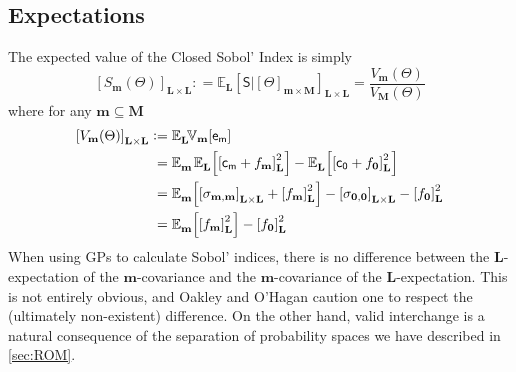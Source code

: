 \documentclass[preprint,12pt]{elsarticle}
\newcommand*{\M}[1]{\ensuremath{#1}\xspace}
\newcommand*{\x}{\times}
\newcommand*{\mi}[1]{\mathbf{#1}}
\newcommand*{\rv}[1]{\mathsf{#1}}
\newcommand*{\te}[2][]{\left\lbrack{#2}\right\rbrack_{#1}}
\newcommand*{\deq}{\M{\mathrel{\mathop:}=}}
\newcommand*{\ev}[3][]{\mathbb{E}_{#3}^{#1}\!\left\lbrack{#2}\right\rbrack}
\newcommand*{\evt}[3][]{\mathbb{E}_{#3}^{#1}\!#2}
\newcommand*{\cov}[3][]{\ifthenelse{\equal{#1}{}}{\mathbb{V}_{#3}\!\left\lbrack{#2}\right\rbrack}{\mathbb{V}_{#3}\!\left\lbrack{#2,#1}\right\rbrack}}
\begin{document}
    \subsection{Expectations} \label{sub:Sobol:Expectations}
        The expected value of the Closed Sobol' Index is simply
        \begin{equation*}
            \te[\mi{L}\x\mi{L}]{S_\mi{m}(\Theta)} \deq 
            \evt{\te[\mi{L}\x\mi{L}]{\rv{S} \big\vert \te[\mi{m}\x\mi{M}]{\Theta}}}{\mi{L}} =
            \frac
            {V_{\mi{m}}(\Theta)}
            {V_{\mi{M}}(\Theta)}
        \end{equation*}
        where for any $\mi{m}\subseteq\mi{M}$
        \begin{equation*}
            \begin{aligned}
                \te[\mi{L\x L}]{V_{\mi{m}}(\Theta)} &\deq \evt{\cov{\rv{e_{m}}}{\mi{m}}}{\mi{L}} \\
                &\phantom{:}= \evt{\;\ev{\te[\mi{L}]{\rv{c_{m}} + f_{\mi{m}}}^{2}}{\mi{L}}}{\mi{m}} - \ev{\te[\mi{L}]{\rv{c_{0}} + f_{\mi{0}}}^{2}}{\mi{L}} \\
                &\phantom{:}= \ev{\te[\mi{L\x L}]{\sigma_{\mi{m,m}}} + \te[\mi{L}]{f_{\mi{m}}}^{2}}{\mi{m}} - \te[\mi{L\x L}]{\sigma_{\mi{0,0}}} - \te[\mi{L}]{f_{\mi{0}}}^{2}\\
                &\phantom{:}= \ev{\te[\mi{L}]{f_{\mi{m}}}^{2}}{\mi{m}} - \te[\mi{L}]{f_{\mi{0}}}^{2}
            \end{aligned}
        \end{equation*}
        When using GPs to calculate Sobol' indices, there is no difference between the $\mi{L}$-expectation of the $\mi{m}$-covariance and the $\mi{m}$-covariance of the $\mi{L}$-expectation. This is not entirely obvious, and Oakley and O'Hagan \cite{Oakley.OHagan2004} caution one to respect the (ultimately non-existent) difference. On the other hand, valid interchange is a natural consequence of the separation of probability spaces we have described in \cref{sec:ROM}.
\end{document}
